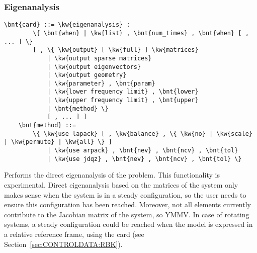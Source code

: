 \subsubsection{Eigenanalysis}
\label{sec:IVP:eigenanalysis}
\begin{Verbatim}[commandchars=\\\{\}]
    \bnt{card} ::= \kw{eigenanalysis} :
        \{ \bnt{when} | \kw{list} , \bnt{num_times} , \bnt{when} [ , ... ] \}
        [ , \{ \kw{output} [ \kw{full} ] \kw{matrices}
            | \kw{output sparse matrices}
            | \kw{output eigenvectors}
            | \kw{output geometry}
            | \kw{parameter} , \bnt{param}
            | \kw{lower frequency limit} , \bnt{lower}
            | \kw{upper frequency limit} , \bnt{upper}
            | \bnt{method} \}
            [ , ... ] ]
    \bnt{method} ::=
        \{ \kw{use lapack} [ , \kw{balance} , \{ \kw{no} | \kw{scale} | \kw{permute} | \kw{all} \} ]
            | \kw{use arpack} , \bnt{nev} , \bnt{ncv} , \bnt{tol}
            | \kw{use jdqz} , \bnt{nev} , \bnt{ncv} , \bnt{tol} \} 
\end{Verbatim}
Performs the direct eigenanalysis of the problem.
This functionality is experimental.
Direct eigenanalysis based on the matrices of the system
only makes sense when the system is in a steady configuration,
so the user needs to ensure this configuration has been reached.
Moreover, not all elements currently contribute to the Jacobian
matrix of the system, so YMMV.
In case of rotating systems, a steady configuration could be reached
when the model is expressed in a relative reference frame,
using the  card
(see Section~\ref{sec:CONTROLDATA:RBK}).

